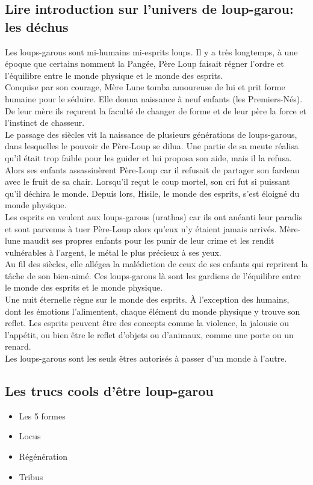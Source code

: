 \documentclass[oneside,12pt]{book}
\begin{document}
\begin{flushleft}
        \section{Lire introduction sur l'univers de loup-garou: les déchus}
       Les loups-garous sont mi-humains mi-esprits loups. Il y a très longtemps, à une époque que certains nomment la Pangée, Père Loup faisait régner l'ordre et l’équilibre entre le monde physique et le monde des esprits.\\ Conquise par son courage, Mère Lune tomba amoureuse de lui et prit forme humaine pour le séduire. Elle donna naissance à neuf enfants (les Premiers-Nés). De leur mère ils reçurent la faculté de changer de forme et de leur père la force et l'instinct de chasseur.\\ 
       Le passage des siècles vit la naissance de plusieurs générations de loups-garous, dans lesquelles le pouvoir de Père-Loup se dilua. Une partie de sa meute réalisa qu'il était trop faible pour les guider et lui proposa son aide, mais il la refusa. Alors ses enfants assassinèrent Père-Loup car il refusait de partager son fardeau avec le fruit de sa chair. Lorsqu’il reçut le coup mortel, son cri fut si puissant qu’il déchira le monde. Depuis lors, Hisile, le monde des esprits, s’est éloigné du monde physique.\\ Les esprits en veulent aux loups-garous (urathas) car ils ont anéanti leur paradis et sont parvenus à tuer Père-Loup alors qu’eux n’y étaient jamais arrivés. Mère-lune maudit ses propres enfants pour les punir de leur crime et les rendit vulnérables à l'argent, le métal le plus précieux à ses yeux.\\ Au fil des siècles, elle allégea la malédiction de ceux de ses enfants qui reprirent la tâche de son bien-aimé. Ces loups-garous là sont les gardiens de l’équilibre entre le monde des esprits et le monde physique.  \\
Une nuit éternelle règne sur le monde des esprits. À l’exception des humains, dont les émotions l’alimentent, chaque élément du monde physique y trouve son reflet. Les esprits peuvent être des concepts comme la violence, la jalousie ou l'appétit, ou bien être le reflet d’objets ou d’animaux, comme une porte ou un renard.\\ Les loups-garous sont les seuls êtres autorisés à passer d’un monde à l’autre.
\subsection{Les trucs cools d'être loup-garou}
\begin{itemize}
\item Les 5 formes 
\item Locus
\item Régénération
\item Tribus
\end{itemize}


\end{flushleft}
\end{document}
